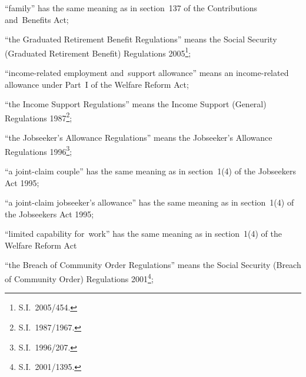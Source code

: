 \documentclass[12pt,a4paper]{article}
\begin{document}
\begin{enumerate}
“family” has the same meaning as in section~137 of the Contributions and~Benefits Act;


“the Graduated Retirement Benefit Regulations” means the Social Security (Graduated Retirement Benefit) Regulations 2005\footnote{S.I.~2005/454.};

“income-related employment and~support allowance” means an income-related allowance under Part~I of the Welfare Reform Act;

“the Income Support Regulations” means the Income Support (General) Regulations 1987\footnote{\frenchspacing S.I.~1987/1967.};

“the Jobseeker’s Allowance Regulations” means the Jobseeker’s Allowance Regulations 1996\footnote{\frenchspacing S.I.~1996/207.};

“a joint-claim couple” has the same meaning as in section~1(4) of the Jobseekers Act 1995;

    “a joint-claim jobseeker’s allowance” has the same meaning as in section~1(4) of the Jobseekers Act 1995;


“limited capability for~work” has the same meaning as in section~1(4) of the Welfare Reform Act

“the Breach of Community Order Regulations” means the Social Security (Breach of Community Order) Regulations 2001\footnote{S.I.~2001/1395.};

\end{enumerate}
\end{document}
